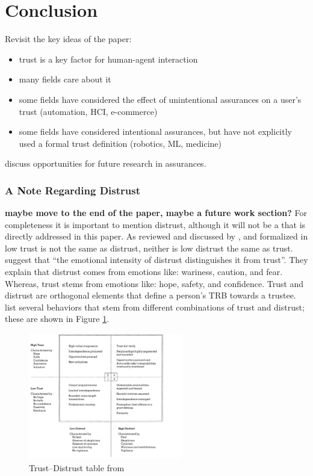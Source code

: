 \section{Conclusion} \label{sec:conclusions}
    Revisit the key ideas of the paper:

    \begin{itemize}
        \item trust is a key factor for human-agent interaction
        \item many fields care about it
        \item some fields have considered the effect of unintentional assurances on a user's trust (automation, HCI, e-commerce)
        \item some fields have considered intentional assurances, but have not explicitly used a formal trust definition (robotics, ML, medicine)
    \end{itemize}

    discuss opportunities for future research in assurances.

    \subsubsection{A Note Regarding Distrust}
    \textbf{maybe move to the end of the paper, maybe a future work section?}
        For completeness it is important to mention distrust, although it will not be a that is directly addressed in this paper. As reviewed and discussed by \citet{Lewicki1998-ox}, and formalized in \cite{McKnight2001-hm,McKnight2001-gz} low trust is not the same as distrust, neither is low distrust the same as trust. \citet{McKnight2001-gz} suggest that ``the emotional intensity of distrust distinguishes it from trust''. They explain that distrust comes from emotions like: wariness, caution, and fear. Whereas, trust stems from emotions like: hope, safety, and confidence. Trust and distrust are orthogonal elements that define a person's TRB towards a trustee. \citet{Lewicki1998-ox} list several behaviors that stem from different combinations of trust and distrust; these are shown in Figure \ref{fig:distrust_table}.

        \begin{figure}[!htbp]
            \centering
            \includegraphics[width=0.6\textwidth]{Figures/distrust_table}
            \caption{Trust--Distrust table from \cite{Lewicki1998-ox}}
            \label{fig:distrust_table}
        \end{figure}

